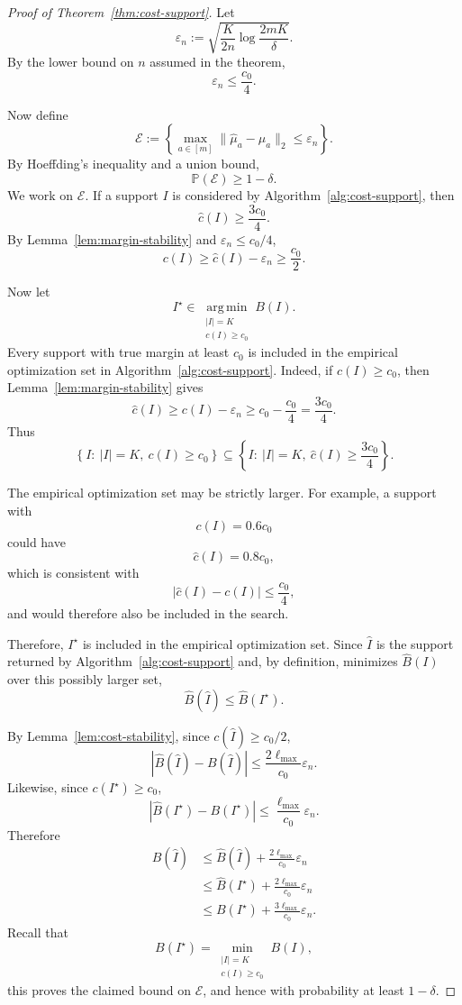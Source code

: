 \documentclass[twoside]{article}
\begin{document}
\begin{proof}[Proof of Theorem~\ref{thm:cost-support}]
Let
\[
\varepsilon_n
:=
\sqrt{
\frac{K}{2n}
\log\frac{2mK}{\delta}
}.
\]
By the lower bound on \(n\) assumed in the theorem,
\[
\varepsilon_n
\leq
\frac{c_0}{4}.
\]

Now define
\[
\mathcal E
:=
\left\{
\max_{a\in[m]}
\|\widehat\mu_a-\mu_a\|_2
\leq
\varepsilon_n
\right\}.
\]
By Hoeffding's inequality and a union bound,
\[
\mathbb P(\mathcal E)\geq 1-\delta.
\]
We work on \(\mathcal E\).
If a support \(I\) is considered by Algorithm~\ref{alg:cost-support}, then
\[
\widehat c(I)\geq \frac{3c_0}{4}.
\]
By Lemma~\ref{lem:margin-stability} and
\(\varepsilon_n\leq c_0/4\),
\[
c(I)
\geq
\widehat c(I)-\varepsilon_n
\geq
\frac{c_0}{2}.
\]

Now let
\[
I^\star
\in
\operatorname*{arg\,min}_{\substack{|I|=K\\c(I)\geq c_0}}
B(I).
\]
Every support with true margin at least \(c_0\) is included in the
empirical optimization set in Algorithm~\ref{alg:cost-support}. Indeed, if \(c(I)\geq c_0\), then
Lemma~\ref{lem:margin-stability} gives
\[
\widehat c(I)
\geq
c(I)-\varepsilon_n
\geq
c_0-\frac{c_0}{4}
=
\frac{3c_0}{4}.
\]
Thus
\[
\left\{
I:\ |I|=K,\ c(I)\geq c_0
\right\}
\subseteq
\left\{
I:\ |I|=K,\ \widehat c(I)\geq\frac{3c_0}{4}
\right\}.
\]

The empirical optimization set may be strictly larger. For example, a
support with
\[
c(I)=0.6c_0
\]
could have
\[
\widehat c(I)=0.8c_0,
\]
which is consistent with
\[
|\widehat c(I)-c(I)|
\leq
\frac{c_0}{4},
\]
and would therefore also be included in the search.

Therefore, \(I^\star\) is included in the empirical optimization set.
Since \(\widehat I\) is the support returned by
Algorithm~\ref{alg:cost-support} and, by definition, minimizes
\(\widehat B(I)\) over this possibly larger set,
\[
\widehat B(\widehat I)
\leq
\widehat B(I^\star).
\]

By Lemma~\ref{lem:cost-stability}, since
\(c(\widehat I)\geq c_0/2\),
\[
|\widehat B(\widehat I)-B(\widehat I)|
\leq
\frac{2\ell_{\max}}{c_0}\varepsilon_n.
\]
Likewise, since \(c(I^\star)\geq c_0\),
\[
|\widehat B(I^\star)-B(I^\star)|
\leq
\frac{\ell_{\max}}{c_0}\varepsilon_n.
\]
Therefore
\[
\begin{aligned}
B(\widehat I)
&\leq
\widehat B(\widehat I)
+
\frac{2\ell_{\max}}{c_0}\varepsilon_n\\
&\leq
\widehat B(I^\star)
+
\frac{2\ell_{\max}}{c_0}\varepsilon_n\\
&\leq
B(I^\star)
+
\frac{3\ell_{\max}}{c_0}\varepsilon_n.
\end{aligned}
\]
Recall that
\[
B(I^\star)
=
\min_{\substack{|I|=K\\c(I)\geq c_0}}B(I),
\]
this proves the claimed bound on \(\mathcal E\), and hence with
probability at least \(1-\delta\).
\end{proof}
\end{document}
